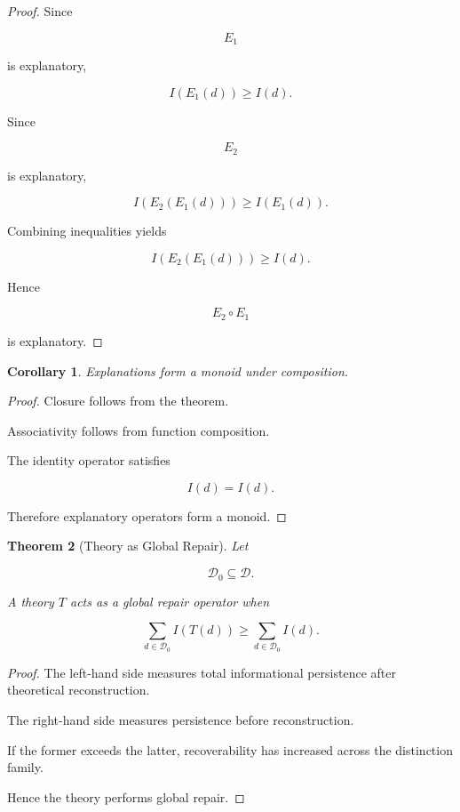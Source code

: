 \documentclass[12pt,oneside]{article}
\newtheorem{theorem}{Theorem}[section] \newtheorem{lemma}[theorem]{Lemma} \newtheorem{proposition}[theorem]{Proposition} \newtheorem{corollary}[theorem]{Corollary}
\theoremstyle{definition}
\begin{document}
\begin{proof}

Since

\[
E_1
\]

is explanatory,

\[
I(E_1(d))
\ge
I(d).
\]

Since

\[
E_2
\]

is explanatory,

\[
I(E_2(E_1(d)))
\ge
I(E_1(d)).
\]

Combining inequalities yields

\[
I(E_2(E_1(d)))
\ge
I(d).
\]

Hence

\[
E_2\circ E_1
\]

is explanatory.

\end{proof}

\begin{corollary}

Explanations form a monoid under composition.

\end{corollary}

\begin{proof}

Closure follows from the theorem.

Associativity follows from function composition.

The identity operator satisfies

\[
I(d)=I(d).
\]

Therefore explanatory operators form a monoid.

\end{proof}

\begin{theorem}[Theory as Global Repair]

Let

\[
\mathcal D_0
\subseteq
\mathcal D.
\]

A theory \(T\) acts as a global repair operator when

\[
\sum_{d\in\mathcal D_0}
I(T(d))
\ge
\sum_{d\in\mathcal D_0}
I(d).
\]

\end{theorem}

\begin{proof}

The left-hand side measures total informational persistence after theoretical reconstruction.

The right-hand side measures persistence before reconstruction.

If the former exceeds the latter, recoverability has increased across the distinction family.

Hence the theory performs global repair.

\end{proof}
\end{document}
